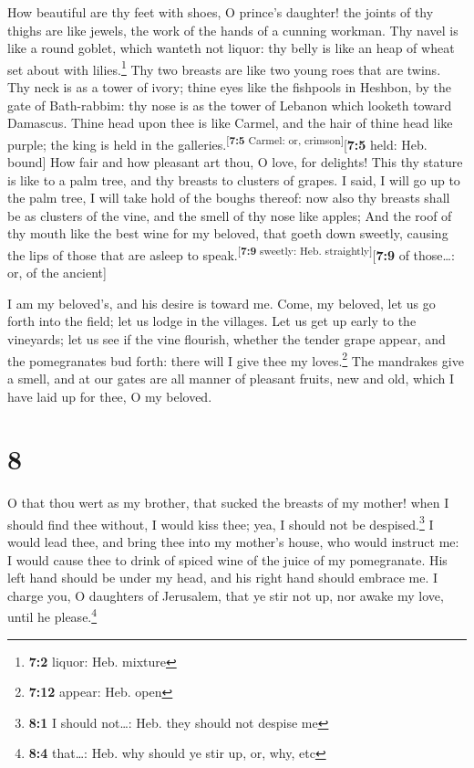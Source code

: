  How beautiful are thy feet with shoes, O prince's
daughter! the joints of thy thighs are like jewels, the work of the
hands of a cunning workman.  Thy navel is like a round
goblet, which wanteth not liquor: thy belly is like an heap of wheat set
about with lilies.\footnote{\textbf{7:2} liquor: Heb. mixture}
 Thy two breasts are like two young roes that are twins.
 Thy neck is as a tower of ivory; thine eyes like the
fishpools in Heshbon, by the gate of Bath-rabbim: thy nose is as the
tower of Lebanon which looketh toward Damascus.  Thine
head upon thee is like Carmel, and the hair of thine head like purple;
the king is held in the galleries.\textsuperscript{{[}\textbf{7:5}
Carmel: or, crimson{]}}{[}\textbf{7:5} held: Heb. bound{]}
 How fair and how pleasant art thou, O love, for delights!
 This thy stature is like to a palm tree, and thy breasts
to clusters of grapes.  I said, I will go up to the palm
tree, I will take hold of the boughs thereof: now also thy breasts shall
be as clusters of the vine, and the smell of thy nose like apples;
 And the roof of thy mouth like the best wine for my
beloved, that goeth down sweetly, causing the lips of those that are
asleep to speak.\textsuperscript{{[}\textbf{7:9} sweetly: Heb.
straightly{]}}{[}\textbf{7:9} of those\ldots: or, of the ancient{]}

 I am my beloved's, and his desire is toward me.
 Come, my beloved, let us go forth into the field; let us
lodge in the villages.  Let us get up early to the
vineyards; let us see if the vine flourish, whether the tender grape
appear, and the pomegranates bud forth: there will I give thee my
loves.\footnote{\textbf{7:12} appear: Heb. open}  The
mandrakes give a smell, and at our gates are all manner of pleasant
fruits, new and old, which I have laid up for thee, O my beloved.

\hypertarget{section-7}{%
\section{8}\label{section-7}}

 O that thou wert as my brother, that sucked the breasts
of my mother! when I should find thee without, I would kiss thee; yea, I
should not be despised.\footnote{\textbf{8:1} I should not\ldots: Heb.
  they should not despise me}  I would lead thee, and
bring thee into my mother's house, who would instruct me: I would cause
thee to drink of spiced wine of the juice of my pomegranate.
 His left hand should be under my head, and his right hand
should embrace me.  I charge you, O daughters of
Jerusalem, that ye stir not up, nor awake my love, until he
please.\footnote{\textbf{8:4} that\ldots: Heb. why should ye stir up,
  or, why, etc}

